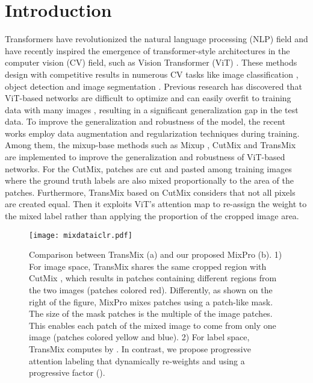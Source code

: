 \documentclass{article} \usepackage{iclr2023_conference,times}
\begin{document}
\section{Introduction}
\label{secIntro}
Transformers \citep{vaswani2017attention} have revolutionized the natural language processing (NLP) field and have recently inspired the emergence of transformer-style architectures in the computer vision (CV) field, such as Vision Transformer (ViT) \citep{2020ViTs}. These methods design with competitive results in numerous CV tasks like image classification \citep{deit, TokentoToken, pyramidViTs, swin, cait, ali2021xcit}, object detection \citep{fang2021youYOLOS, dai2021dynamicdetr, detr, zhu2020deformabledetr} and image segmentation \citep{strudel2021segmenter, pyramidViTs, swin}. Previous research has discovered that ViT-based networks are difficult to optimize and can easily overfit to training data with many images \citep{russakovsky2015imagenet}, resulting in a significant generalization gap in the test data. To improve the generalization and robustness of the model, the recent works \citep{2020ViTs, deit, TokentoToken, pyramidViTs, swin, cait, ali2021xcit} employ data augmentation \citep{zhang2017mixup} and regularization techniques \citep{labelsmoothing} during training. Among them, the mixup-base methods such as Mixup \citep{zhang2017mixup}, CutMix \citep{yun2019cutmix} and TransMix \citep{chen2021transmix} are implemented to improve the generalization and robustness of ViT-based networks. For the CutMix, patches are cut and pasted among training images where the ground truth labels are also mixed proportionally to the area of the patches. Furthermore, TransMix based on CutMix considers that not all pixels are created equal. Then it exploits ViT's attention map to re-assign the weight to the mixed label rather than applying the proportion of the cropped image area.

    
\begin{figure*}[t]
\centering
\texttt{[image: mixdataiclr.pdf]}
\caption{ Comparison between TransMix \citep{chen2021transmix} (a) and our proposed MixPro (b). 1) For image space, TransMix shares the same cropped region with CutMix \citep{yun2019cutmix}, which results in patches containing different regions from the two images (patches colored red). Differently, as shown on the right of the figure, MixPro mixes patches using a patch-like mask. The size of the mask patches is the multiple of the image patches. This enables each patch of the mixed image to come from only one image (patches colored yellow and blue). 2) For label space, TransMix computes  by . In contrast, we propose progressive attention labeling that dynamically re-weights  and  using a progressive factor ().}

\label{figFramework}
\vspace{-20px}
\end{figure*}
\end{document}
